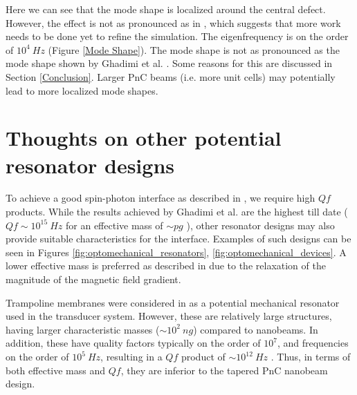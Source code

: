 \documentclass[%
 reprint,
nofootinbib,
 amsmath,amssymb,
 aps,
]{revtex4-2}
\begin{document}
Here we can see that the mode shape is localized around the central defect. However, the effect is not as pronounced as in \cite{ghadimi_main_paper}, which suggests that more work needs to be done yet to refine the simulation. The eigenfrequency is on the order of $10^4 \ Hz$ (Figure \ref{Mode Shape}). The mode shape is not as pronounced as the mode shape shown by Ghadimi et al. \cite{ghadimi_main_paper}.  Some reasons for this are discussed in Section \ref{Conclusion}. Larger PnC beams (i.e. more unit cells) may potentially lead to more localized mode shapes.  



\section{Thoughts on other potential resonator designs}\label{Thoughts}

To achieve a good spin-photon interface as described in \cite{project_paper}, we require high $Qf$ products. While the results achieved by Ghadimi et al. are the highest till date ($Qf \sim 10^{15} \ Hz$ for an effective mass of $\sim pg$ \cite{ghadimi_main_paper}), other resonator designs may also provide suitable characteristics for the interface. Examples of such designs can be seen in Figures \ref{fig:optomechanical_resonators}, \ref{fig:optomechanical_devices}. A lower effective mass is preferred as described in \cite{project_paper} due to the relaxation of the magnitude of the magnetic field gradient.
\newline

Trampoline membranes were considered in \cite{project_paper} as a potential mechanical resonator used in the transducer system. However, these are relatively large structures, having larger characteristic masses ($\sim 10^2 \ ng$) compared to nanobeams. In addition, these have quality factors typically on the order of $10^7$, and frequencies on the order of $10^5 \ Hz$, resulting in a $Qf$ product of $\sim 10^{12} \ Hz$ \cite{mechanical_resonators_optomechanics_room_temp, SiN_trampoline_resonators}. Thus, in terms of both effective mass and $Qf$, they are inferior to the tapered PnC nanobeam design. 
\newline
\end{document}
